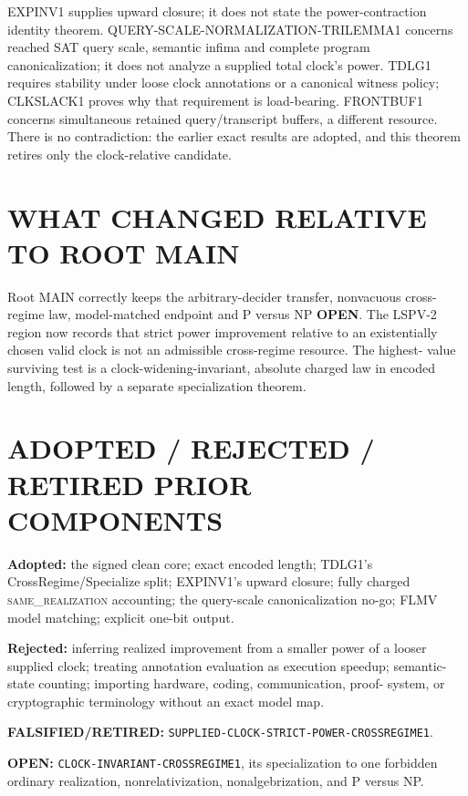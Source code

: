 \documentclass[11pt]{article}
\newcommand{\OPEN}{\textbf{OPEN}}
\newcommand{\same}{\textsc{same\_realization}}
\begin{document}
EXPINV1 supplies upward closure; it does not state the power-contraction
identity theorem.  QUERY-SCALE-NORMALIZATION-TRILEMMA1 concerns reached SAT
query scale, semantic infima and complete program canonicalization; it does
not analyze a supplied total clock's power.  TDLG1 requires stability under
loose clock annotations or a canonical witness policy; CLKSLACK1 proves why
that requirement is load-bearing.  FRONTBUF1 concerns simultaneous retained
query/transcript buffers, a different resource.  There is no contradiction:
the earlier exact results are adopted, and this theorem retires only the
clock-relative candidate.

\section{WHAT CHANGED RELATIVE TO ROOT MAIN}

Root MAIN correctly keeps the arbitrary-decider transfer, nonvacuous
cross-regime law, model-matched endpoint and P versus NP \OPEN.  The LSPV-2
region now records that strict power improvement relative to an existentially
chosen valid clock is not an admissible cross-regime resource.  The highest-
value surviving test is a clock-widening-invariant, absolute charged law in
encoded length, followed by a separate specialization theorem.

\section{ADOPTED / REJECTED / RETIRED PRIOR COMPONENTS}

\textbf{Adopted:} the signed clean core; exact encoded length; TDLG1's
CrossRegime/Specialize split; EXPINV1's upward closure; fully charged
\same{} accounting; the query-scale canonicalization no-go; FLMV model
matching; explicit one-bit output.

\textbf{Rejected:} inferring realized improvement from a smaller power of a
looser supplied clock; treating annotation evaluation as execution speedup;
semantic-state counting; importing hardware, coding, communication, proof-
system, or cryptographic terminology without an exact model map.

\textbf{FALSIFIED/RETIRED:}
\texttt{SUPPLIED-CLOCK-STRICT-POWER-CROSSREGIME1}.

\textbf{OPEN:} \texttt{CLOCK-INVARIANT-CROSSREGIME1}, its specialization to
one forbidden ordinary realization, nonrelativization, nonalgebrization, and
P versus NP.
\end{document}
